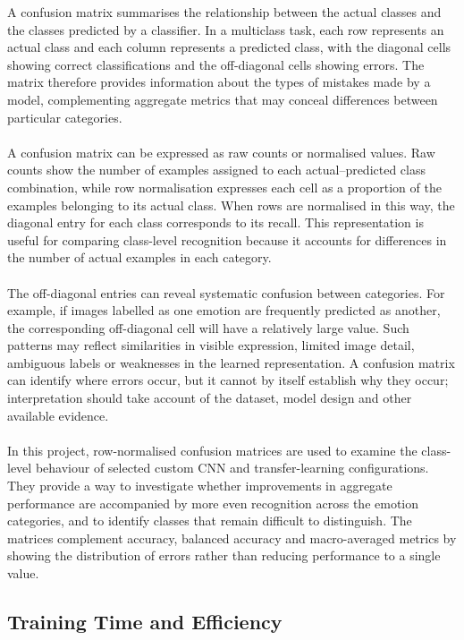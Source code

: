 \documentclass[12pt, a4paper]{report}
\let\oldsubsection\subsection
\renewcommand{\subsection}{%
    \Needspace{6\baselineskip}%
    \oldsubsection
}
\begin{document}
				A confusion matrix summarises the relationship between the actual classes and the classes predicted by a classifier. In a multiclass task, each row represents an actual class and each column represents a predicted class, with the diagonal cells showing correct classifications and the off-diagonal cells showing errors. The matrix therefore provides information about the types of mistakes made by a model, complementing aggregate metrics that may conceal differences between particular categories.\\\\
				A confusion matrix can be expressed as raw counts or normalised values. Raw counts show the number of examples assigned to each actual--predicted class combination, while row normalisation expresses each cell as a proportion of the examples belonging to its actual class. When rows are normalised in this way, the diagonal entry for each class corresponds to its recall. This representation is useful for comparing class-level recognition because it accounts for differences in the number of actual examples in each category.\\\\
				The off-diagonal entries can reveal systematic confusion between categories. For example, if images labelled as one emotion are frequently predicted as another, the corresponding off-diagonal cell will have a relatively large value. Such patterns may reflect similarities in visible expression, limited image detail, ambiguous labels or weaknesses in the learned representation. A confusion matrix can identify where errors occur, but it cannot by itself establish why they occur; interpretation should take account of the dataset, model design and other available evidence.\\\\
				In this project, row-normalised confusion matrices are used to examine the class-level behaviour of selected custom CNN and transfer-learning configurations. They provide a way to investigate whether improvements in aggregate performance are accompanied by more even recognition across the emotion categories, and to identify classes that remain difficult to distinguish. The matrices complement accuracy, balanced accuracy and macro-averaged metrics by showing the distribution of errors rather than reducing performance to a single value.
				
			\newpage
			\subsection{Training Time and Efficiency}
				
\end{document}
